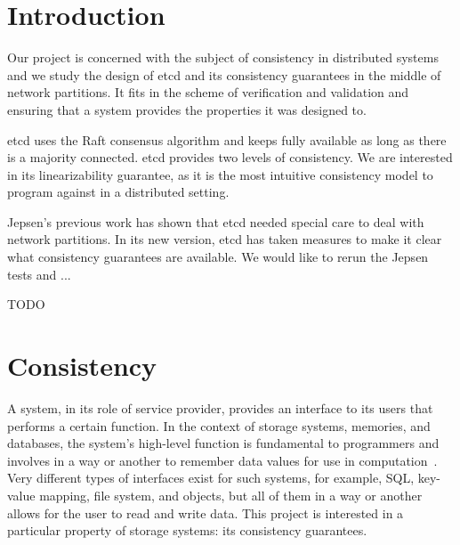 \documentclass[12pt,conference]{IEEEtran}
\begin{document}




%
\IEEEpeerreviewmaketitle



\section{Introduction}

Our project is concerned with the subject of consistency in distributed systems and we study the design of etcd and its consistency guarantees in the middle of network partitions. It fits in the scheme of verification and validation and ensuring that a system provides the properties it was designed to.

etcd uses the Raft consensus algorithm and keeps fully available as long as there is a majority connected. etcd provides two levels of consistency. We are interested in its linearizability guarantee, as it is the most intuitive consistency model to program against in a distributed setting.

Jepsen's previous work has shown that etcd needed special care to deal with network partitions. In its new version, etcd has taken measures to make it clear what consistency guarantees are available. We would like to rerun the Jepsen tests and ...

TODO


\section{Consistency}

A system, in its role of service provider, provides an interface to its users that performs a certain function. In the context of storage systems, memories, and databases, the system's high-level function is fundamental to programmers and involves in a way or another to remember data values for use in computation~\cite{saltzer2009principles}. Very different types of interfaces exist for such systems, for example, SQL, key-value mapping, file system, and objects, but all of them in a way or another allows for the user to read and write data. This project is interested in a particular property of storage systems: its consistency guarantees.
\end{document}
